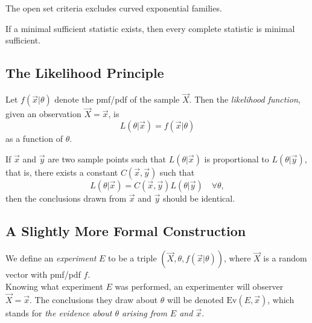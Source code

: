 \begin{remark}
    The open set criteria excludes curved exponential families.
\end{remark}

\begin{theorem}
    If a minimal sufficient statistic exists, then every complete statistic is minimal sufficient.
\end{theorem}


    
\subsection{The Likelihood Principle}

\begin{definition}[Likelihood]
    Let $f(\vec{x}\vert{} \theta)$ denote the pmf/pdf of the sample $\vec{X}$. Then the \emph{likelihood function}, given an observation $\vec{X} = \vec{x}$, is
    \[
        L(\theta \vert{} \vec{x}) = f(\vec{x} \vert{} \theta)
    \]
    as a function of $\theta$.
\end{definition}

\begin{definition}
    If $\vec{x}$ and $\vec{y}$ are two sample points such that $L(\theta \vert{} \vec{x})$ is proportional to $L(\theta \vert{} \vec{y})$, that is, there exists a constant $C(\vec{x}, \vec{y})$ such that 
    \[
        L(\theta \vert{} \vec{x}) = C(\vec{x}, \vec{y})L(\theta \vert{} \vec{y}) \quad \forall \theta,
    \]
    then the conclusions drawn from $\vec{x}$ and $\vec{y}$ should be identical.
\end{definition}

\subsection{A Slightly More Formal Construction}
\begin{definition}[Experiment]
    We define an \emph{experiment} $E$ to be a triple $(\vec{X}, \theta, f(\vec{x}\vert{}\theta))$, where $\vec{X}$ is a random vector with pmf/pdf $f$.\\
    
    Knowing what experiment $E$ was performed, an experimenter will observer $\vec{X} = \vec{x}$. The conclusions they draw about $\theta$ will be denoted $\text{Ev}(E, \vec{x})$, which stands for \emph{the evidence about $\theta$ arising from $E$ and $\vec{x}$}.
\end{definition}

